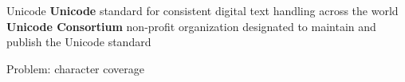 \documentclass[../index.tex]{subfiles}
\begin{document}
\renewcommand{\currenttitle}{Unicode}
\begin{frame}{\currenttitle}
%
%
  \textbf{Unicode} \textendash{}
      standard for consistent digital text handling across the world \\[1em]
  \textbf{Unicode Consortium} \textendash{}
      non-profit organization designated to maintain and publish the Unicode standard
\end{frame}

\renewcommand{\currenttitle}{Problem: character coverage}
\begin{frame}[standout]
%
  Problem: character coverage
\end{frame}
\end{document}
